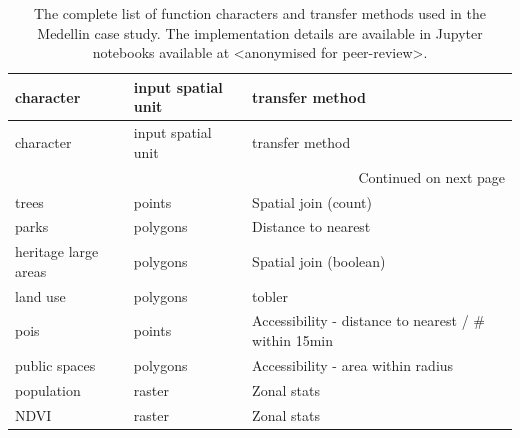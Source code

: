 \begin{longtable}{p{5cm}p{3cm}p{5cm}}
\caption{The complete list of function characters and transfer methods used in the Medellin case study. The implementation details are available
in Jupyter notebooks available at <anonymised for peer-review>.}
\label{tab:fn_med} \\
\toprule
                                            character & input spatial unit &                                    transfer method \\
\midrule
\endfirsthead

\toprule
                                            character & input spatial unit &                                    transfer method \\
\midrule
\endhead
\midrule
\multicolumn{3}{r}{{Continued on next page}} \\
\midrule
\endfoot

\bottomrule
\endlastfoot
                trees &   points &                               Spatial join (count) \\
                parks & polygons &                                Distance to nearest \\
heritage large areas & polygons &                               Spatial join (boolean) \\
            land use & polygons &                                             tobler \\
                pois &   points & Accessibility  - distance to nearest / \# within 15min \\
        public spaces & polygons &             Accessibility  -  area within radius \\
            population &   raster &                                        Zonal stats \\
                NDVI &   raster &                                        Zonal stats \\
\end{longtable}


